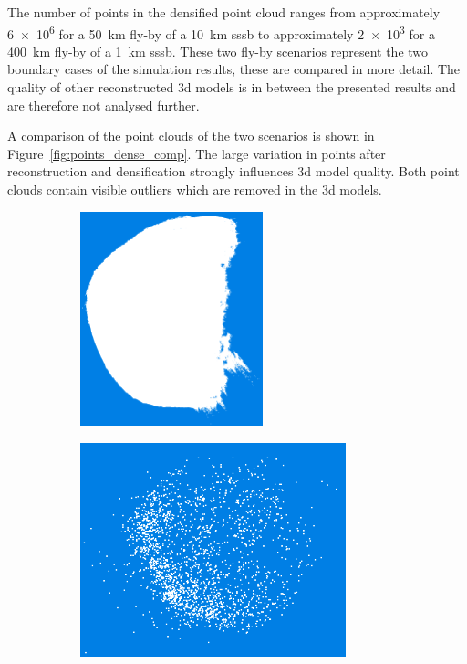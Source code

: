 The number of points in the densified point cloud ranges from approximately \SI{6e6}{} for a \SI{50}{\kilo\meter} fly-by of a \SI{10}{\kilo\meter} \gls{sssb} to approximately \SI{2e3}{} for a \SI{400}{\kilo\meter} fly-by of a \SI{1}{\kilo\meter} \gls{sssb}. These two fly-by scenarios represent the two boundary cases of the simulation results, these are compared in more detail. The quality of other reconstructed \gls{3d} models is in between the presented results and are therefore not analysed further.

A comparison of the point clouds of the two scenarios is shown in Figure~\ref{fig:points_dense_comp}. The large variation in points after reconstruction and densification strongly influences \gls{3d} model quality. Both point clouds contain visible outliers which are removed in the \gls{3d} models.
\begin{figure}[htb]
    \centering
        \begin{subfigure}[b]{0.42\textwidth}
            \centering
            \includegraphics[width=\textwidth,height=6.2cm]{doc/thesis/0_figures/models_quality/50_10/120_50_10_dense2.png}
            \caption{}
            \label{fig:points_50_10}
        \end{subfigure}
        \begin{subfigure}[b]{0.42\textwidth}
            \centering
            \includegraphics[width=\textwidth,height=6.2cm]{doc/thesis/0_figures/models_quality/400_1/120_400_1_points2.png}

\end{subfigure}
\end{figure}
